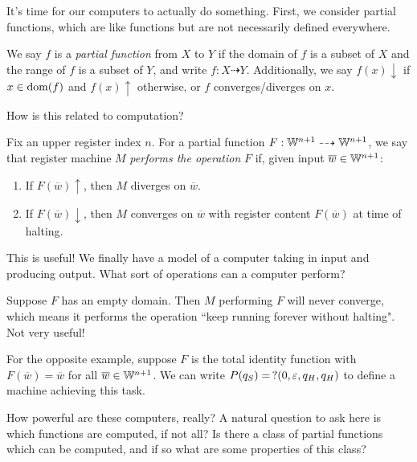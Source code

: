 \documentclass{article}
\begin{document}
It's time for our computers to actually do something. First, we consider partial functions, which are like functions but are not necessarily defined everywhere.

\begin{definition}
	We say $f$ is a \textit{partial function} from $X$ to $Y$ if the domain of $f$ is a subset of $X$ and the range of $f$ is a subset of $Y$, and write $f: X \dashrightarrow Y$. Additionally, we say $f(x)\downarrow$ if $x \in \operatorname{dom}(f)$ and $f(x)\uparrow$ otherwise, or $f$ converges/diverges on $x$.
\end{definition}

How is this related to computation?

\begin{definition}
	Fix an upper register index $n$. For a partial function $F: \mathbb{W}^{n+1} \dashrightarrow \mathbb{W}^{n+1}$, we say that register machine $M$ \textit{performs the operation} $F$ if, given input $\overline w \in \mathbb{W}^{n+1}$:
	\begin{enumerate}
		\item If $F(\overline w)\uparrow$, then $M$ diverges on $\overline w$.
		\item If $F(\overline w)\downarrow$, then $M$ converges on $\overline w$ with register content $F(\overline w)$ at time of halting.
	\end{enumerate}
\end{definition}

This is useful! We finally have a model of a computer taking in input and producing output. What sort of operations can a computer perform?

\begin{example}
	Suppose $F$ has an empty domain. Then $M$ performing $F$ will never converge, which means it performs the operation ``keep running forever without halting". Not very useful!
	    
	For the opposite example, suppose $F$ is the total identity function with $F(\overline w) = \overline w$ for all $\overline w \in \mathbb{W}^{n+1}$. We can write $P(q_S) = \, ?(0, \varepsilon, q_H, q_H)$ to define a machine achieving this task.
\end{example}

How powerful are these computers, really? A natural question to ask here is which functions are computed, if not all? Is there a class of partial functions which can be computed, and if so what are some properties of this class?
\end{document}
